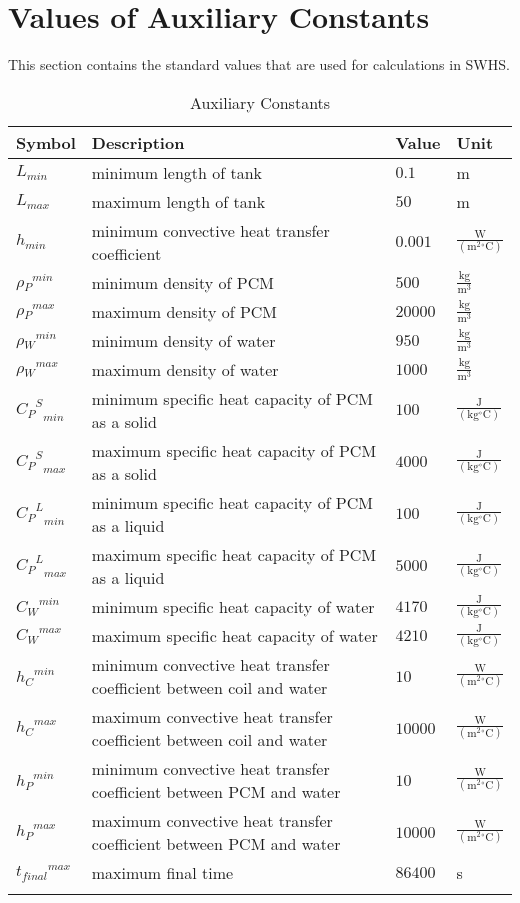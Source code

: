 \documentclass[12pt]{article}
\begin{document}
\section{Values of Auxiliary Constants}
\label{Sec:AuxConstants}
This section contains the standard values that are used for calculations in SWHS.
\begin{longtabu}{l X[l] l l}
\toprule
Symbol & Description & Value & Unit
\\
\midrule
${L_{min}}$ & minimum length of tank & $0.1$ & m
\\
${L_{max}}$ & maximum length of tank & $50$ & m
\\
${h_{min}}$ & minimum convective heat transfer coefficient & $0.001$ & $\frac{\text{W}}{(\text{m}^{2}{}^{\circ}\text{C})}$
\\
${{\rho{}_{P}}^{min}}$ & minimum density of PCM & $500$ & $\frac{\text{kg}}{\text{m}^{3}}$
\\
${{\rho{}_{P}}^{max}}$ & maximum density of PCM & $20000$ & $\frac{\text{kg}}{\text{m}^{3}}$
\\
${{\rho{}_{W}}^{min}}$ & minimum density of water & $950$ & $\frac{\text{kg}}{\text{m}^{3}}$
\\
${{\rho{}_{W}}^{max}}$ & maximum density of water & $1000$ & $\frac{\text{kg}}{\text{m}^{3}}$
\\
${{{C_{P}}^{S}}_{min}}$ & minimum specific heat capacity of PCM as a solid & $100$ & $\frac{\text{J}}{(\text{kg}{}^{\circ}\text{C})}$
\\
${{{C_{P}}^{S}}_{max}}$ & maximum specific heat capacity of PCM as a solid & $4000$ & $\frac{\text{J}}{(\text{kg}{}^{\circ}\text{C})}$
\\
${{{C_{P}}^{L}}_{min}}$ & minimum specific heat capacity of PCM as a liquid & $100$ & $\frac{\text{J}}{(\text{kg}{}^{\circ}\text{C})}$
\\
${{{C_{P}}^{L}}_{max}}$ & maximum specific heat capacity of PCM as a liquid & $5000$ & $\frac{\text{J}}{(\text{kg}{}^{\circ}\text{C})}$
\\
${{C_{W}}^{min}}$ & minimum specific heat capacity of water & $4170$ & $\frac{\text{J}}{(\text{kg}{}^{\circ}\text{C})}$
\\
${{C_{W}}^{max}}$ & maximum specific heat capacity of water & $4210$ & $\frac{\text{J}}{(\text{kg}{}^{\circ}\text{C})}$
\\
${{h_{C}}^{min}}$ & minimum convective heat transfer coefficient between coil and water & $10$ & $\frac{\text{W}}{(\text{m}^{2}{}^{\circ}\text{C})}$
\\
${{h_{C}}^{max}}$ & maximum convective heat transfer coefficient between coil and water & $10000$ & $\frac{\text{W}}{(\text{m}^{2}{}^{\circ}\text{C})}$
\\
${{h_{P}}^{min}}$ & minimum convective heat transfer coefficient between PCM and water & $10$ & $\frac{\text{W}}{(\text{m}^{2}{}^{\circ}\text{C})}$
\\
${{h_{P}}^{max}}$ & maximum convective heat transfer coefficient between PCM and water & $10000$ & $\frac{\text{W}}{(\text{m}^{2}{}^{\circ}\text{C})}$
\\
${{t_{final}}^{max}}$ & maximum final time & $86400$ & s
\\
\bottomrule
\caption{Auxiliary Constants}
\label{Table:TAuxConsts}
\end{longtabu}
\end{document}
